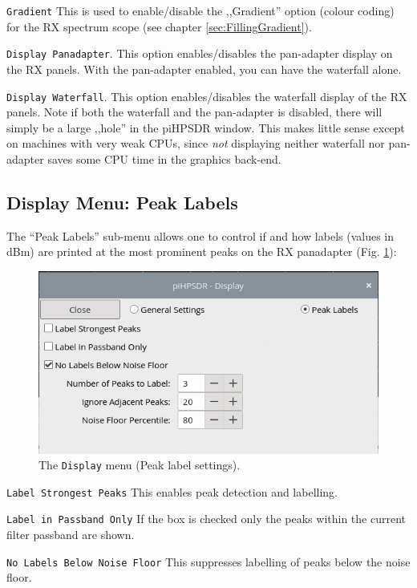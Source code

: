 \documentclass[12pt]{book}
\def\rett#1{\texttt{\color{red}#1}}
\def\bltt#1{\texttt{\color{blue}#1}}
\def\pH{pi\-HPSDR\xspace}
\begin{document}
\rett{Gradient} This is used to enable/disable the ,,Gradient'' option
(colour coding) for the RX spectrum scope (see chapter \ref{sec:FillingGradient}).

\rett{Display Panadapter}. This option enables/disables the pan-adapter display
on the RX panels. With the pan-adapter enabled, you can have the waterfall alone.

\rett{Display Waterfall}. This option enables/disables the waterfall display
of the RX panels. Note if both the waterfall and the pan-adapter is disabled,
there will simply be a large ,,hole'' in the \pH window. This makes little sense
except on machines with very weak CPUs, since \textit{not} displaying neither waterfall
nor pan-adapter saves some CPU time in the graphics back-end.

\subsection{Display Menu: Peak Labels}

The ``Peak Labels'' sub-menu allows one to control if and how labels
(values in dBm) are printed at the most prominent peaks on the
RX panadapter (Fig. \ref{fig:DisplayMenuPeak}):


\begin{figure}[ht]
\center
\includegraphics[scale=0.45]{DisplayMenuPeak.png}
\caption{The \bltt{Display} menu (Peak label settings).}
\label{fig:DisplayMenuPeak}
\end{figure}

\rett{Label Strongest Peaks} This enables peak detection and labelling.

\rett{Label in Passband Only} If the box is checked only the peaks within the
current filter passband  are shown.

\rett{No Labels Below Noise Floor} This suppresses labelling of peaks below the noise floor.
\end{document}
